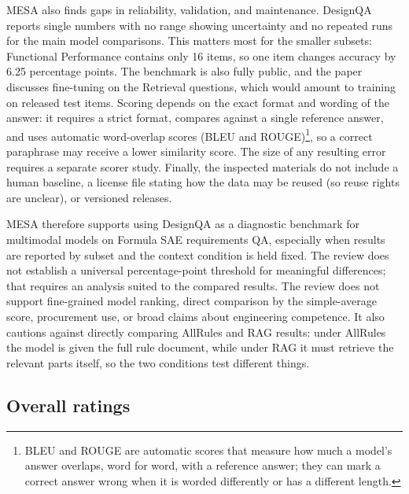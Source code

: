 \documentclass[conference]{IEEEtran}
\begin{document}
        MESA also finds gaps in reliability, validation, and maintenance. DesignQA reports single numbers with no range showing uncertainty and no repeated runs for the main model comparisons. This matters most for the smaller subsets: Functional Performance contains only 16 items, so one item changes accuracy by 6.25 percentage points. The benchmark is also fully public, and the paper discusses fine-tuning on the Retrieval questions, which would amount to training on released test items. Scoring depends on the exact format and wording of the answer: it requires a strict format, compares against a single reference answer, and uses automatic word-overlap scores (BLEU and ROUGE)\footnote{BLEU and ROUGE are automatic scores that measure how much a model's answer overlaps, word for word, with a reference answer; they can mark a correct answer wrong when it is worded differently or has a different length.}, so a correct paraphrase may receive a lower similarity score. The size of any resulting error requires a separate scorer study. Finally, the inspected materials do not include a human baseline, a license file stating how the data may be reused (so reuse rights are unclear), or versioned releases.

        MESA therefore supports using DesignQA as a diagnostic benchmark for multimodal models on Formula SAE requirements QA, especially when results are reported by subset and the context condition is held fixed. The review does not establish a universal percentage-point threshold for meaningful differences; that requires an analysis suited to the compared results. The review does not support fine-grained model ranking, direct comparison by the simple-average score, procurement use, or broad claims about engineering competence. It also cautions against directly comparing AllRules and RAG results: under AllRules the model is given the full rule document, while under RAG it must retrieve the relevant parts itself, so the two conditions test different things.

    \subsection{Overall ratings}
        
\end{document}
